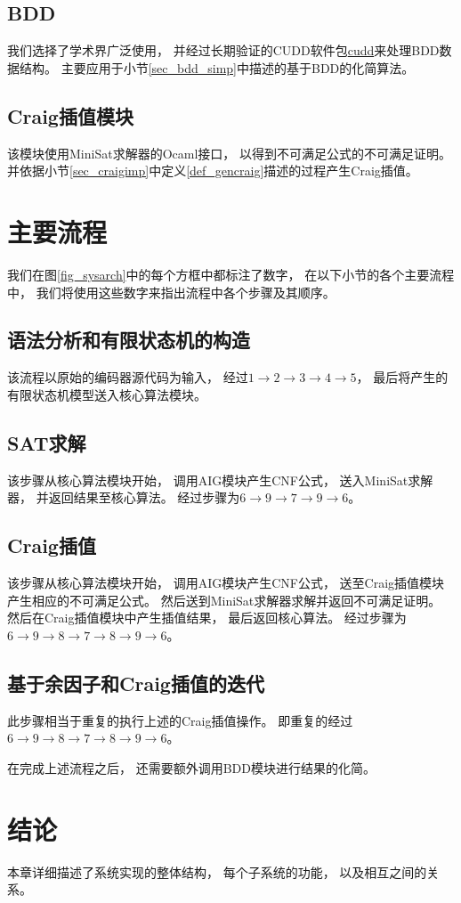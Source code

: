 \subsection{BDD}
我们选择了学术界广泛使用，
并经过长期验证的CUDD软件包\url{cudd}来处理BDD数据结构。
主要应用于小节\ref{sec_bdd_simp}中描述的基于BDD的化简算法。


\subsection{Craig插值模块}
该模块使用MiniSat求解器的Ocaml接口，
以得到不可满足公式的不可满足证明。
并依据小节\ref{sec_craigimp}中定义\ref{def_gencraig}描述的过程产生Craig插值。

\section{主要流程}
我们在图\ref{fig_sysarch}中的每个方框中都标注了数字，
在以下小节的各个主要流程中，
我们将使用这些数字来指出流程中各个步骤及其顺序。

\subsection{语法分析和有限状态机的构造}
该流程以原始的编码器源代码为输入，
经过$1\to 2\to 3\to 4\to 5$，
最后将产生的有限状态机模型送入核心算法模块。

\subsection{SAT求解}
该步骤从核心算法模块开始，
调用AIG模块产生CNF公式，
送入MiniSat求解器，
并返回结果至核心算法。
经过步骤为$6\to 9\to 7\to 9\to 6$。

\subsection{Craig插值}
该步骤从核心算法模块开始，
调用AIG模块产生CNF公式，
送至Craig插值模块产生相应的不可满足公式。
然后送到MiniSat求解器求解并返回不可满足证明。
然后在Craig插值模块中产生插值结果，
最后返回核心算法。
经过步骤为$6\to 9 \to 8 \to 7 \to 8 \to 9 \to 6$。


\subsection{基于余因子和Craig插值的迭代}
此步骤相当于重复的执行上述的Craig插值操作。
即重复的经过$6\to 9 \to 8 \to 7 \to 8 \to 9 \to 6$。

在完成上述流程之后，
还需要额外调用BDD模块进行结果的化简。

\section{结论}\label{hahahahah}
本章详细描述了系统实现的整体结构，
每个子系统的功能，
以及相互之间的关系。
